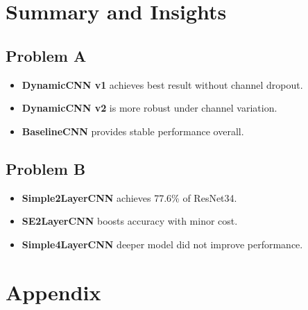 \documentclass[12pt]{article}
\begin{document}
\section*{Summary and Insights}

\subsection*{Problem A}
\begin{itemize}[noitemsep]
    \item \textbf{DynamicCNN v1} achieves best result without channel dropout.
    \item \textbf{DynamicCNN v2} is more robust under channel variation.
    \item \textbf{BaselineCNN} provides stable performance overall.
\end{itemize}

\subsection*{Problem B}
\begin{itemize}[noitemsep]
    \item \textbf{Simple2LayerCNN} achieves 77.6\% of ResNet34.
    \item \textbf{SE2LayerCNN} boosts accuracy with minor cost.
    \item \textbf{Simple4LayerCNN} deeper model did not improve performance.
\end{itemize}

\section*{Appendix}
\end{document}
